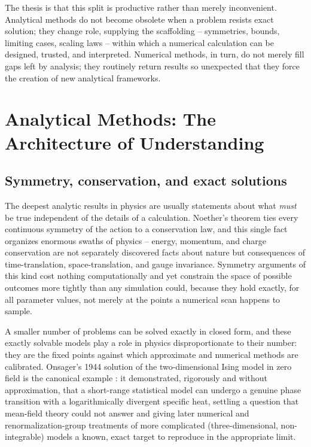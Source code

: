 The thesis  is that this split is productive rather than merely inconvenient.
Analytical methods do not become obsolete when a problem resists exact
solution; they change role, supplying the scaffolding -- symmetries, bounds,
limiting cases, scaling laws -- within which a numerical calculation can be
designed, trusted, and interpreted. Numerical methods, in turn, do not merely
fill gaps left by analysis; they routinely return results so unexpected that
they force the creation of new analytical frameworks. 
\section{Analytical Methods: The Architecture of Understanding}

\subsection{Symmetry, conservation, and exact solutions}

The deepest analytic results in physics are usually statements about what
\emph{must} be true independent of the details of a calculation. Noether's
theorem ties every continuous symmetry of the action to a conservation law, and
this single fact organizes enormous swaths of physics -- energy, momentum, and
charge conservation are not separately discovered facts about nature but
consequences of time-translation, space-translation, and gauge invariance.
Symmetry arguments of this kind cost nothing computationally and yet constrain
the space of possible outcomes more tightly than any simulation could, because
they hold exactly, for all parameter values, not merely at the points a
numerical scan happens to sample.

A smaller number of problems can be solved exactly in closed form, and these
exactly solvable models play a role in physics disproportionate to their
number: they are the fixed points against which approximate and numerical
methods are calibrated. Onsager's 1944 solution of the two-dimensional Ising
model in zero field is the canonical example \cite{Onsager1944}: it
demonstrated, rigorously and without approximation, that a short-range
statistical model can undergo a genuine phase transition with a logarithmically
divergent specific heat, settling a question that mean-field theory could not
answer and giving later numerical and renormalization-group treatments of more
complicated (three-dimensional, non-integrable) models a known, exact target to
reproduce in the appropriate limit.

